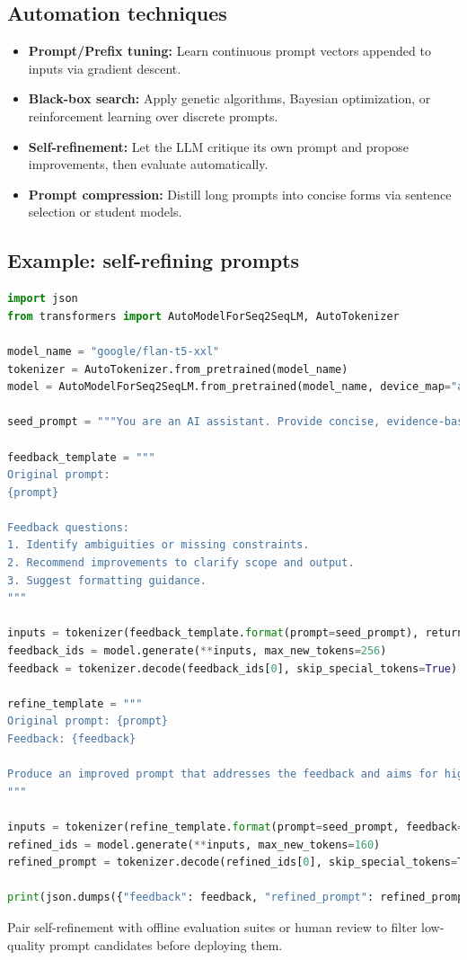 \documentclass{article}
\begin{document}
\subsection{Automation techniques}
\begin{itemize}
  \item \textbf{Prompt/Prefix tuning:} Learn continuous prompt vectors appended to inputs via gradient descent.
  \item \textbf{Black-box search:} Apply genetic algorithms, Bayesian optimization, or reinforcement learning over discrete prompts.
  \item \textbf{Self-refinement:} Let the LLM critique its own prompt and propose improvements, then evaluate automatically.
  \item \textbf{Prompt compression:} Distill long prompts into concise forms via sentence selection or student models.
\end{itemize}

\subsection{Example: self-refining prompts}
\begin{lstlisting}[language=Python,caption={LLM-driven prompt refinement with self-feedback}]
import json
from transformers import AutoModelForSeq2SeqLM, AutoTokenizer

model_name = "google/flan-t5-xxl"
tokenizer = AutoTokenizer.from_pretrained(model_name)
model = AutoModelForSeq2SeqLM.from_pretrained(model_name, device_map="auto")

seed_prompt = """You are an AI assistant. Provide concise, evidence-based product comparisons."""

feedback_template = """
Original prompt:
{prompt}

Feedback questions:
1. Identify ambiguities or missing constraints.
2. Recommend improvements to clarify scope and output.
3. Suggest formatting guidance.
"""

inputs = tokenizer(feedback_template.format(prompt=seed_prompt), return_tensors="pt").to(model.device)
feedback_ids = model.generate(**inputs, max_new_tokens=256)
feedback = tokenizer.decode(feedback_ids[0], skip_special_tokens=True)

refine_template = """
Original prompt: {prompt}
Feedback: {feedback}

Produce an improved prompt that addresses the feedback and aims for higher-quality responses.
"""

inputs = tokenizer(refine_template.format(prompt=seed_prompt, feedback=feedback), return_tensors="pt").to(model.device)
refined_ids = model.generate(**inputs, max_new_tokens=160)
refined_prompt = tokenizer.decode(refined_ids[0], skip_special_tokens=True)

print(json.dumps({"feedback": feedback, "refined_prompt": refined_prompt}, indent=2))
\end{lstlisting}
Pair self-refinement with offline evaluation suites or human review to filter low-quality prompt candidates before deploying them.
\end{document}

